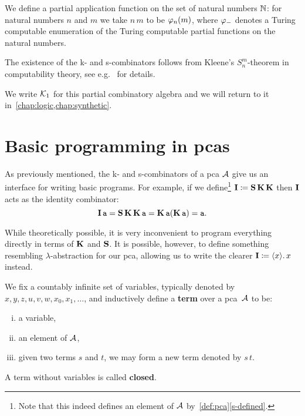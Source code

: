 \begin{example}\label{ex:Kleene-1}
  We define a partial application function on the set of natural numbers
  \(\Nat\): for natural numbers \(n\) and \(m\) we take \(n\,m\) to be
  \(\prenum{n}(m)\), where \(\prenum{-}\) denotes a Turing computable
  enumeration of the Turing computable partial functions on the natural numbers.

  The existence of the k- and s-combinators follows from Kleene's
  \(S^m_n\)-theorem in computability theory, see e.g.~\cite[Section~2.5.1 and
  Theorem~2.1.5]{Bauer2023} for details.

  We write \(\Kone\) for this partial combinatory algebra and we will return to
  it in~\cref{chap:logic,chap:synthetic}.
\end{example}

\section{Basic programming in pcas}

As previously mentioned, the k- and s-combinators of a pca \(\AA\) give us an
interface for writing basic programs. For example, if we define\footnote{Note
  that this indeed defines an element of \(\AA\)
  by~\cref{def:pca}\ref{s-defined}.}
\(\icomb \coloneq \scomb\kcomb\kcomb\) then \(\icomb\) acts as the
identity combinator:
\[
  \icomb\pca{a} = \scomb\kcomb\kcomb\pca{a} = \kcomb\pca{a}(\kcomb\pca{a}) =
  {\pca{a}}.
\]

While theoretically possible, it is very inconvenient to program everything
directly in terms of \(\kcomb\) and \(\scomb\). It is possible, however, to
define something resembling \(\lambda\)-abstraction for our pca, allowing us to
write the clearer \(\icomb \coloneq \lambdapca{x}{\var{x}}\) instead.

\begin{definition}
  We fix a countably infinite set of variables, typically denoted by
  \(x,y,z,u,v,w,x_0,x_1,\dots\), and inductively define a \textbf{term} over a
  pca~\(\AA\) to be:
  \begin{enumerate}[(i)]
  \item a variable,
  \item an element of \(\AA\),
  \item given two terms \(s\) and \(t\), we may form a new term denoted by \(s\,t\).
  \end{enumerate}
  A term without variables is called \textbf{closed}.
\end{definition}

